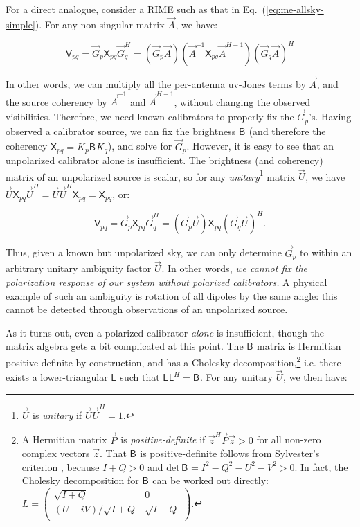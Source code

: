\documentclass[referee]{aa}
\newcommand{\matrixtt}[4]{\left( \begin{array}{cc}#1&#2\\#3&#4\\\end{array} \right)}
\newcommand{\herm}{H}
\newcommand{\jones}[2]{\vec {#1}_{#2}}
\newcommand{\jonesinv}[2]{\vec {#1}^{-1}_{#2}}
\newcommand{\jonesT}[2]{\vec {#1}^{\herm}_{#2}}
\newcommand{\jonesTinv}[2]{\vec {#1}^{{\herm}-1}_{#2}}
\newcommand{\coh}[2]{\mathsf{{#1}}_{{#2}}}
\begin{document}
For a direct analogue, consider a RIME such as that in Eq.~(\ref{eq:me-allsky-simple}). For any non-singular matrix $\jones{A}{}$, we have: 

\[
\coh{V}{pq} = \jones{G}{p} \coh{X}{pq} \jonesT{G}{q} = 
(\jones{G}{p} \jones{A}{})(\jonesinv{A}{} \coh{X}{pq} \jonesTinv{A}{})(\jones{G}{q} \jones{A}{})^H \]

In other words, we can multiply all the per-antenna uv-Jones terms by $\jones{A}{}$, and the source coherency by $\jonesinv{A}{}$ and $\jonesTinv{A}{}$, without changing the observed visibilities. Therefore, we need known calibrators to properly fix the $\jones{G}{p}$'s. Having observed a calibrator source, we can fix the brightness $\coh{B}{}$ (and therefore the coherency $\coh{X}{pq}=K_p\coh{B}{}K_q$), and solve for $\jones{G}{p}$. However, it is easy to see that an unpolarized calibrator alone is insufficient. The brightness (and coherency) matrix of an unpolarized source is scalar, so for any {\em unitary}\footnote{$\jones{U}{}$ is {\em unitary} if $\jones{U}{}\jonesT{U}{}=1$.} matrix $\jones{U}{}$, we have $\jones{U}{}\coh{X}{pq}\jonesT{U}{}=\jones{U}{}\jonesT{U}{}\coh{X}{pq} = \coh{X}{pq}$, or: 

\[
\coh{V}{pq} = \jones{G}{p} \coh{X}{pq} \jonesT{G}{q} = (\jones{G}{p} \jones{U}{}) \coh{X}{pq} (\jones{G}{q} \jones{U}{} )^\herm.
\]

Thus, given a known but unpolarized sky, we can only determine $\jones{G}{p}$ to within an arbitrary unitary ambiguity factor $\jones{U}{}$. In other words, {\em we cannot fix the polarization response of our system without polarized calibrators.} A physical example of such an ambiguity is rotation of all dipoles by the same angle: this cannot be detected through observations of an unpolarized source.

As it turns out, even a polarized calibrator {\em alone} is insufficient, though the matrix algebra gets a bit complicated at this point. The $\coh{B}{}$ matrix is Hermitian positive-definite by construction, and has a Cholesky 
decomposition,\footnote{A Hermitian matrix $\jones{P}{}$ is {\em positive-definite} if $\vec z^\herm\jones{P}{}\vec z > 0$ for all non-zero complex vectors $\vec z$. That $\coh{B}{}$ is positive-definite follows from Sylvester's criterion \citep{Gilbert:SylvestersCriterion}, because $I+Q>0$ and $\mathrm{det}\,\coh{B}{}=I^2-Q^2-U^2-V^2>0$. In fact, the Cholesky decomposition for $\coh{B}{}$ can be worked out directly: $L=\matrixtt{\sqrt{I+Q}}{0}{(U-iV)/\sqrt{I+Q}}{\sqrt{I-Q}}.$} 
i.e. there exists a lower-triangular $\coh{L}{}$ such that $\coh{L}{}\coh{L}{}^H=\coh{B}{}$. For any unitary $\jones{U}{}$, we then have:
\end{document}
